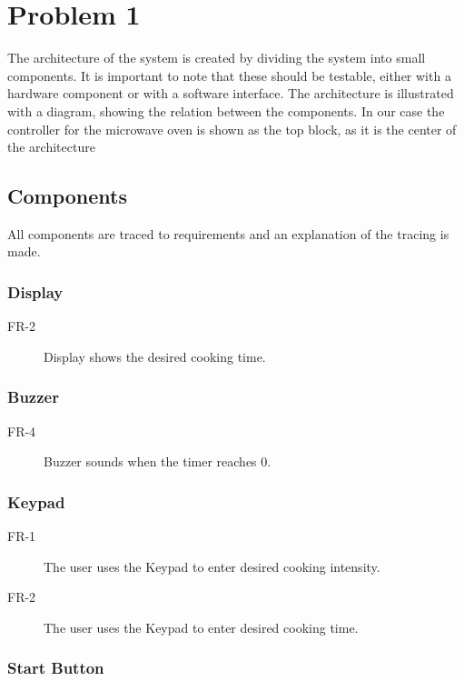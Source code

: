 \chapter{Problem 1}
The architecture of the system is created by dividing the system into small components. It is important to note that these should be testable, either with a hardware component or with a software interface.
The architecture is illustrated with a diagram, showing the relation between the components. In our case the controller for the microwave oven is shown as the top block, as it is the center of the architecture


\section{Components}
All components are traced to requirements and an explanation of the tracing is made.

\subsection*{Display} 
\begin{description}
	\item[FR-2] Display shows the desired cooking time.
\end{description}

\subsection*{Buzzer}

\begin{description}
	\item[FR-4] Buzzer sounds when the timer reaches 0.
\end{description}

\subsection*{Keypad}

\begin{description}
	\item[FR-1] The user uses the Keypad to enter desired cooking intensity.
	\item[FR-2] The user uses the Keypad to enter desired cooking time.
\end{description}

\subsection*{Start Button}

